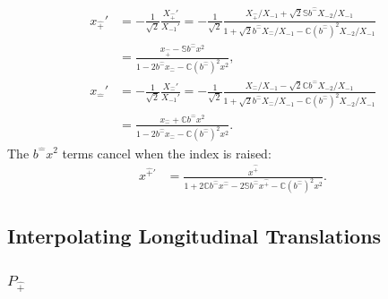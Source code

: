 \documentclass[foundations,article,submit,pdftex,moreauthors]{Definitions/mdpi}
\begin{document}
\begin{align}
x_{\hat{+}}'
&=-\frac{1}{\sqrt{2}}\frac{X_{\hat{+}}'}{X_{-1}'}
=-\frac{1}{\sqrt{2}}
\frac{X_{\hat{+}}/X_{-1}+\sqrt{2}\mathbb{S}b^{\hat{-}}X_{-2}/X_{-1}}
{1+\sqrt{2}b^{\hat{-}}X_{\hat{-}}/X_{-1}
 -\mathbb{C}(b^{\hat{-}})^2X_{-2}/X_{-1}}\nonumber\\
&=\frac{x_{\hat{+}}-\mathbb{S}b^{\hat{-}}x^2}
{1-2b^{\hat{-}}x_{\hat{-}}-\mathbb{C}(b^{\hat{-}})^2x^2}, \nonumber\\
x_{\hat{-}}'
&=-\frac{1}{\sqrt{2}}\frac{X_{\hat{-}}'}{X_{-1}'}
=-\frac{1}{\sqrt{2}}
\frac{X_{\hat{-}}/X_{-1}-\sqrt{2}\mathbb{C}b^{\hat{-}}X_{-2}/X_{-1}}
{1+\sqrt{2}b^{\hat{-}}X_{\hat{-}}/X_{-1}
 -\mathbb{C}(b^{\hat{-}})^2X_{-2}/X_{-1}}\nonumber\\
&=\frac{x_{\hat{-}}+\mathbb{C}b^{\hat{-}}x^2}
{1-2b^{\hat{-}}x_{\hat{-}}-\mathbb{C}(b^{\hat{-}})^2x^2}.
\end{align}
The $b^{\hat{-}}x^2$ terms cancel when the index is raised:
\begin{align}
x^{\hat{+}\prime}
&=\frac{x^{\hat{+}}}
{1+2\mathbb{C}b^{\hat{-}}x^{\hat{-}}
 -2\mathbb{S}b^{\hat{-}}x^{\hat{+}}
 -\mathbb{C}(b^{\hat{-}})^2x^2}.
\end{align}

\subsection{Interpolating Longitudinal Translations}

\subsubsection{\texorpdfstring{$P_{\hat{+}}$}{P hat plus}}
\end{document}

